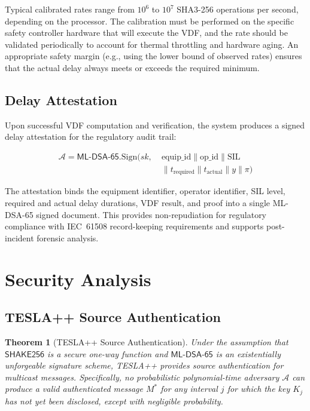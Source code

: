 \documentclass[conference,10pt]{IEEEtran}
\newtheorem{theorem}{Theorem}
\newcommand{\SHAKE}{\textsf{SHAKE256}}
\newcommand{\MLDSA}{\textsf{ML-DSA-65}}
\begin{document}
Typical calibrated rates range from $10^6$ to $10^7$ SHA3-256 operations per second, depending on the processor. The calibration must be performed on the specific safety controller hardware that will execute the VDF, and the rate should be validated periodically to account for thermal throttling and hardware aging. An appropriate safety margin (e.g., using the lower bound of observed rates) ensures that the actual delay always meets or exceeds the required minimum.

\subsection{Delay Attestation}

Upon successful VDF computation and verification, the system produces a signed delay attestation for the regulatory audit trail:

\begin{equation}
\begin{split}
  \mathcal{A} = \MLDSA{}.\text{Sign}\Big(sk,\; &\text{equip\_id} \| \text{op\_id} \| \text{SIL} \\
  &\| t_{\text{required}} \| t_{\text{actual}} \| y \| \pi\Big)
\end{split}
\end{equation}

The attestation binds the equipment identifier, operator identifier, SIL level, required and actual delay durations, VDF result, and proof into a single ML-DSA-65 signed document. This provides non-repudiation for regulatory compliance with IEC~61508 record-keeping requirements and supports post-incident forensic analysis.

\section{Security Analysis}
\label{sec:security}

\subsection{TESLA++ Source Authentication}

\begin{theorem}[TESLA++ Source Authentication]
\label{thm:tesla_auth}
Under the assumption that $\SHAKE{}$ is a secure one-way function and $\MLDSA{}$ is an existentially unforgeable signature scheme, TESLA++ provides source authentication for multicast messages. Specifically, no probabilistic polynomial-time adversary $\mathcal{A}$ can produce a valid authenticated message $M^*$ for any interval $j$ for which the key $K_j$ has not yet been disclosed, except with negligible probability.
\end{theorem}
\end{document}
